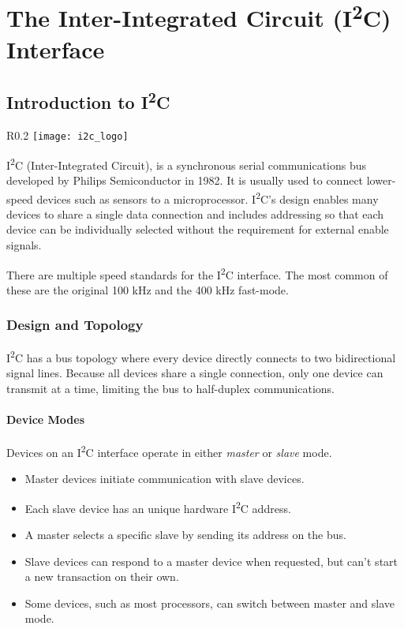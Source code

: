 \documentclass[11pt,fleqn]{book} %
\begin{document}
	
\chapter{The Inter-Integrated Circuit (I\textsuperscript{2}C) Interface}

\section{Introduction to I\textsuperscript{2}C}
    \begin{wrapfigure}{R}{0.2\textwidth}
        \centering\texttt{[image: i2c\_logo]}
    \end{wrapfigure}

    I\textsuperscript{2}C (Inter-Integrated Circuit), is a synchronous serial communications bus developed by Philips Semiconductor in 1982. It is usually used to connect lower-speed devices such as sensors to a microprocessor. I\textsuperscript{2}C's design enables many devices to share a single data connection and includes addressing so that each device can be individually selected without the requirement for external enable signals.
    
    There are multiple speed standards for the  I\textsuperscript{2}C interface. The most common of these are the original 100 kHz and the 400 kHz fast-mode.

    \subsection{Design and Topology}
            I\textsuperscript{2}C has a bus topology where every device directly connects to two bidirectional signal lines. Because all devices share a single connection, only one device can transmit at a time, limiting the bus to half-duplex communications. 

            \subsubsection{Device Modes}
            Devices on an I\textsuperscript{2}C interface operate in either \textit{master} or \textit{slave} mode. 
            \begin{itemize}
                \item Master devices initiate communication with slave devices.
                \item Each slave device has an unique hardware I\textsuperscript{2}C address.
                \item A master selects a specific slave by sending its address on the bus.
                \item Slave devices can respond to a master device when requested, but can't start a new transaction on their own.
                \item Some devices, such as most processors, can switch between master and slave mode.
            \end{itemize}
        
\end{document}
